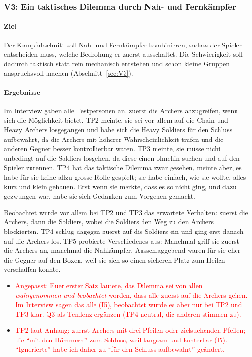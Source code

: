 \documentclass[../Main.tex]{subfiles}
\begin{document}
\subsubsection{V3: Ein taktisches Dilemma durch Nah- und Fernkämpfer}

\paragraph{Ziel}
Der Kampfabschnitt soll Nah- und Fernkämpfer kombinieren, sodass der Spieler entscheiden muss, welche Bedrohung er zuerst ausschaltet. Die Schwierigkeit soll dadurch taktisch statt rein mechanisch entstehen und schon kleine Gruppen anspruchsvoll machen (Abschnitt~\ref{sec:V3}).

\paragraph{Ergebnisse}
Im Interview gaben alle Testpersonen an, zuerst die Archers anzugreifen, wenn sich die Möglichkeit bietet. TP2 meinte, sie sei vor allem auf die Chain und Heavy Archers losgegangen und habe sich die Heavy Soldiers für den Schluss aufbewahrt, da die Archers mit höherer Wahrscheinlichkeit trafen und die anderen Gegner besser kontrollierbar waren. TP3 meinte, sie müsse nicht unbedingt auf die Soldiers losgehen, da diese einen ohnehin suchen und auf den Spieler zurennen. TP4 hat das taktische Dilemma zwar gesehen, meinte aber, es habe für sie keine allzu grosse Rolle gespielt; sie habe einfach, wie sie wollte, alles kurz und klein gehauen. Erst wenn sie merkte, dass es so nicht ging, und dazu gezwungen war, habe sie sich Gedanken zum Vorgehen gemacht.

Beobachtet wurde vor allem bei TP2 und TP3 das erwartete Verhalten: zuerst die Archers, dann die Soldiers, wobei die Soldiers den Weg zu den Archers blockierten. TP4 schlug dagegen zuerst auf die Soldiers ein und ging erst danach auf die Archers los. TP5 probierte Verschiedenes aus: Manchmal griff sie zuerst die Archers an, manchmal die Nahkämpfer. Ausschlaggebend waren für sie eher die Gegner auf den Boxen, weil sie sich so einen sicheren Platz zum Heilen verschaffen konnte.

\begin{itemize}[leftmargin=1.5cm]
    \item \textcolor{red}{Angepasst: Euer erster Satz lautete, das Dilemma sei von allen \emph{wahrgenommen und beobachtet} worden, dass alle zuerst auf die Archers gehen. Im Interview sagen das alle (I5), beobachtet wurde es aber nur bei TP2 und TP3 klar. Q3 als Tendenz ergänzen (TP4 neutral, die anderen stimmen zu).}
    \item \textcolor{red}{TP2 laut Anhang: zuerst Archers mit drei Pfeilen oder zielsuchenden Pfeilen; die \enquote{mit den Hämmern} zum Schluss, weil langsam und konterbar (I5). \enquote{Ignorierte} habe ich daher zu \enquote{für den Schluss aufbewahrt} geändert.}
\end{itemize}
\end{document}
